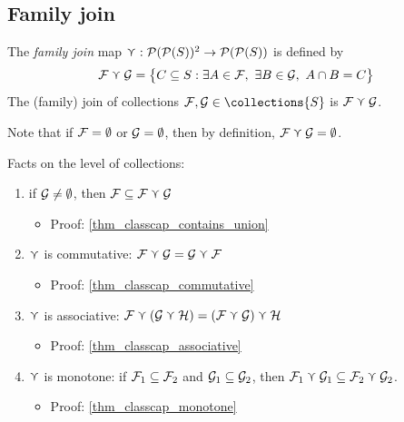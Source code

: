 \clearpage

\subsection{Family join}

\begin{definition}
     The \emph{family join} map $\curlyvee: \mathcal{P}(\mathcal{P}(S))^2 \to \mathcal{P}(\mathcal{P}(S))$ is defined by
    \[\mathcal{F} \curlyvee \mathcal{G} = \big\{C \subseteq S : \exists A \in \mathcal{F}, \ \exists B \in \mathcal{G}, \ A \cap B = C \big\}\]
    The (family) join of collections $\family, \familytwo \in \collections{S}$ is $\mathcal{F} \curlyvee \mathcal{G}$.
\end{definition}

Note that if $\mathcal{F} = \emptyset$ or $\mathcal{G} = \emptyset$, then by definition, $\mathcal{F} \curlyvee \mathcal{G} = \emptyset$.

\vskip0.5cm

Facts on the level of collections:
\begin{enumerate}
    \item {} if $\mathcal{G} \neq \emptyset$, then $\mathcal{F} \subseteq \mathcal{F} \curlyvee \mathcal{G}$
    \begin{itemize}
        \item Proof: \cref{thm_classcap_contains_union}
    \end{itemize}

    \item $\curlyvee$ is commutative: $\mathcal{F} \curlyvee \mathcal{G} = \mathcal{G} \curlyvee \mathcal{F}$
    \begin{itemize}
        \item Proof: \cref{thm_classcap_commutative}
    \end{itemize}
    
    \item $\curlyvee$ is associative: $\mathcal{F} \curlyvee (\mathcal{G} \curlyvee \mathcal{H}) = (\mathcal{F} \curlyvee \mathcal{G}) \curlyvee \mathcal{H}$
    \begin{itemize}
        \item Proof: \cref{thm_classcap_associative}
    \end{itemize}
    
    \item $\curlyvee$ is monotone: if $\mathcal{F}_1 \subseteq \mathcal{F}_2$ and $\mathcal{G}_1 \subseteq \mathcal{G}_2$, then $\mathcal{F}_1 \curlyvee \mathcal{G}_1 \subseteq \mathcal{F}_2 \curlyvee \mathcal{G}_2$.
    \begin{itemize}
        \item Proof: \cref{thm_classcap_monotone}
    \end{itemize}
\end{enumerate}

